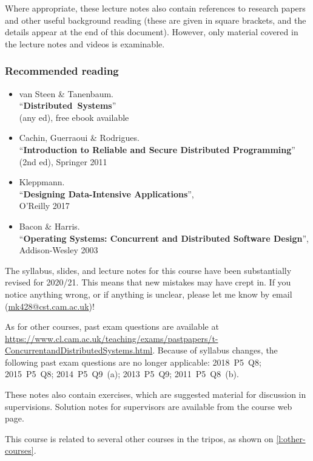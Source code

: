 Where appropriate, these lecture notes also contain references to research papers and other useful background reading (these are given in square brackets, and the details appear at the end of this document).
However, only material covered in the lecture notes and videos is examinable.

\begin{frame}
    \label{s:reading}
    \frametitle{Recommended reading}
    \begin{itemize}
        \item van Steen \& Tanenbaum.\\ ``\textbf{Distributed Systems}''\\(any ed), free ebook available
        \item Cachin, Guerraoui \& Rodrigues. \\ ``\textbf{Introduction to Reliable and Secure Distributed Programming}'' (2nd ed), Springer 2011
        \item Kleppmann.\\ ``\textbf{Designing Data-Intensive Applications}'',\\O’Reilly 2017
        \item Bacon \& Harris.\\ ``\textbf{Operating Systems: Concurrent and Distributed Software Design}'', Addison-Wesley 2003
    \end{itemize}
\end{frame}

The syllabus, slides, and lecture notes for this course have been substantially revised for 2020/21.
This means that new mistakes may have crept in.
If you notice anything wrong, or if anything is unclear, please let me know by email (\url{mk428@cst.cam.ac.uk})!

As for other courses, past exam questions are available at \url{https://www.cl.cam.ac.uk/teaching/exams/pastpapers/t-ConcurrentandDistributedSystems.html}.
Because of syllabus changes, the following past exam questions are no longer applicable: 2018~P5~Q8; 2015~P5~Q8; 2014~P5~Q9~(a); 2013~P5~Q9; 2011~P5~Q8~(b).

These notes also contain exercises, which are suggested material for discussion in supervisions.
Solution notes for supervisors are available from the course web page.

This course is related to several other courses in the tripos, as shown on \autoref{l:other-courses}.

